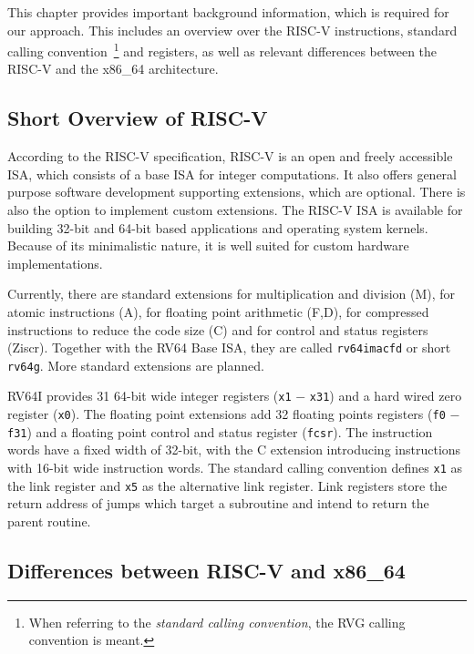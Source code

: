 \documentclass[course=eragp]{aspdoc}
\begin{document}
This chapter provides important background information, which is required for our approach. This
includes an overview over the RISC-V instructions, standard calling convention~\footnote{When
    referring to the \textit{standard calling convention}, the RVG calling convention is meant.} and registers,
as well as relevant differences between the RISC-V and the x86\_64 architecture.

\subsection{Short Overview of RISC-V}

According to the RISC-V specification, RISC-V is an open and freely accessible ISA,
which consists of a base ISA for integer computations. It also offers general purpose software development
supporting extensions, which are optional. There is also the
option to implement custom extensions. The RISC-V ISA is available for building 32-bit and 64-bit based
applications and operating system kernels. Because of its minimalistic nature, it is well suited for
custom hardware implementations.~\cite{rvspec}

\par

Currently, there are standard extensions for multiplication and division (M), for atomic
instructions (A), for floating point arithmetic (F,D), for compressed instructions to reduce the
code size (C) and for control and status registers (Ziscr). Together with the RV64 Base
ISA, they are called \texttt{rv64imacfd} or short \texttt{rv64g}. More standard extensions are planned.~\cite{rvspec}

\par

RV64I provides 31 64-bit wide integer registers (\texttt{x1} $-$ \texttt{x31}) and a hard wired zero register (\texttt{x0}). The floating
point extensions add 32 floating points registers (\texttt{f0} $-$ \texttt{f31}) and a floating point control and status
register (\texttt{fcsr}). The instruction words have a fixed width of 32-bit, with the C extension
introducing instructions with 16-bit wide instruction words. The
standard calling convention defines \texttt{x1} as the link register and \texttt{x5} as the alternative link
register. Link registers store the return address of jumps which target a subroutine and intend to
return the parent routine.~\cite{rvspec}

\subsection{Differences between RISC-V and x86\_64}
\end{document}
